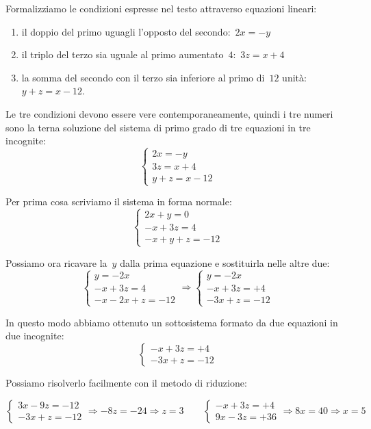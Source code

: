 \begin{soluzione}
Formalizziamo le condizioni espresse nel testo attraverso equazioni
lineari:

\begin{enumerate}[nosep]
\item il doppio del primo uguagli l'opposto del secondo:~\(2x=-y\)
\item il triplo del terzo sia uguale al primo aumentato~\(4\):~\(3z=x+4\)
\item la somma del secondo con il terzo sia inferiore al primo di~\(12\) 
unità:~\(y+z=x-12\).
\end{enumerate}

Le tre condizioni devono essere vere contemporaneamente, quindi i tre
numeri sono la terna soluzione del sistema di primo grado di tre equazioni in 
tre incognite:
\[\left\{\begin{array}{l}
  2x=-y\\
  3z=x+4\\
  y+z=x-12
\end{array}\right.\]

Per prima cosa scriviamo il sistema in forma normale:
\[\left\{\begin{array}{l}
  2x+y=0\\
  -x+3z=4\\
  -x+y+z=-12
\end{array}\right.\]

Possiamo ora ricavare la~\(y\) dalla prima equazione e sostituirla nelle altre 
due:
\[\left\{\begin{array}{l}
  y=-2x\\
  -x+3z=4\\
  -x -2x+z=-12
\end{array}\right.
\Rightarrow
\left\{\begin{array}{l}
  y=-2x\\
  -x+3z=+4\\
  -3x+z=-12
\end{array}\right.\]

In questo modo abbiamo ottenuto un sottosistema formato da due equazioni in 
due incognite:
\[\left\{\begin{array}{l}
  -x+3z=+4\\
  -3x+z=-12
\end{array}\right.\]

Possiamo risolverlo facilmente con il metodo di riduzione:

\[\left\{\begin{array}{l}
  3x-9z=-12\\
  -3x+z=-12
\end{array}\right.
\Rightarrow -8z=-24 \Rightarrow z=3
\qquad
\left\{\begin{array}{l}
  -x+3z=+4\\
  9x-3z=+36
\end{array}\right.
\Rightarrow 8x=40 \Rightarrow x=5
\]


\end{soluzione}
